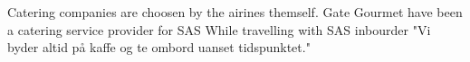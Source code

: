 Catering companies are choosen by the airines themself.
Gate Gourmet have been a catering service provider for SAS
While travelling with SAS inbourder "Vi byder altid på kaffe og te ombord uanset tidspunktet."